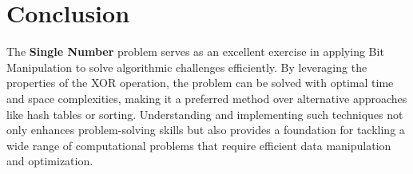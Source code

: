\section*{Conclusion}

The \textbf{Single Number} problem serves as an excellent exercise in applying Bit Manipulation to solve algorithmic challenges efficiently. By leveraging the properties of the XOR operation, the problem can be solved with optimal time and space complexities, making it a preferred method over alternative approaches like hash tables or sorting. Understanding and implementing such techniques not only enhances problem-solving skills but also provides a foundation for tackling a wide range of computational problems that require efficient data manipulation and optimization.

\printindex

% 
% 
% 
% 
% 
% 
% 
% 